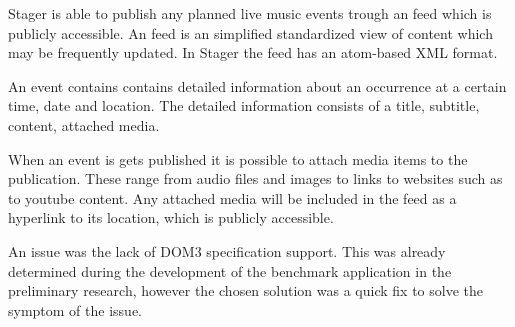 Stager is able to publish any planned live music events trough an feed which is publicly accessible. An feed is an simplified standardized view of content which may be frequently updated. In Stager the feed has an atom-based XML format.

An event contains contains detailed information about an occurrence at a certain time, date and location. The detailed information consists of a title, subtitle, content, attached media. 

When an event is gets published it is possible to attach media items to the publication. These range from audio files and images to  links to websites such as to youtube content. Any attached media will be included in the feed as a hyperlink to its location, which is publicly accessible.




An issue was the lack of DOM3 specification support. This was already determined during the development of the benchmark application in the preliminary research, however the chosen solution was a quick fix to solve the symptom of the issue. 




